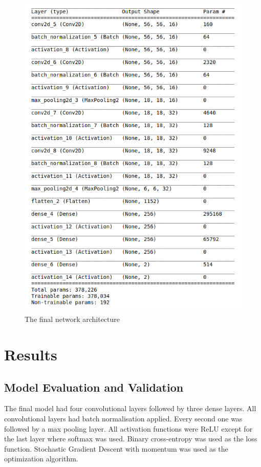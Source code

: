 \documentclass[a4paper]{article}
\begin{document}
\begin{figure}[H]
    \centering
        \includegraphics[width=\textwidth,height=16cm,keepaspectratio]{cnn_summary.png}
    \caption{The final network architecture}
\end{figure}

\pagebreak
\section*{Results}

\subsection*{Model Evaluation and Validation}

The final model had four convolutional layers followed by three dense layers. All convolutional layers had batch
normalisation applied. Every second one was followed by a max pooling layer. All activation functions were ReLU
except for the last layer where softmax was used. Binary cross-entropy was used as the loss function. Stochastic
Gradient Descent with momentum was used as the optimization algorithm.
\end{document}
